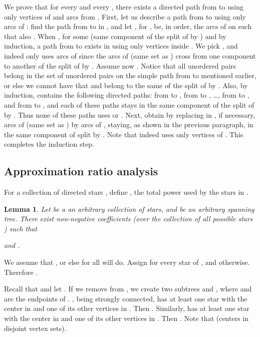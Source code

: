 \documentclass[12pt]{article}
\def\qed{ \ \vrule width.2cm height.2cm depth0cm\smallskip}
\def\proof{\noindent {\bf Proof. \ }}
\newtheorem{lemma}[proposition]{Lemma}
\begin{document}
We prove that
for every  and every , there exists a
directed  path  from  to   using only vertices of 
and arcs from . 
First, let us describe a path  from  to  using only arcs of :
find the path from  to  in ,  and let 
, for ,  
be, in order, the arcs of  on  such that also .
When ,  for some 
(same component of the split of  by ) and by
induction, a path  from  to  exists in  using only vertices
inside . We pick , and indeed  only uses arcs of 
since the arcs of  (same set as )
cross from one component to another of the split of  by .
Assume now . Notice that all unordered pairs 
belong in the set of unordered pairs  on the simple path from
 to  mentioned earlier, or else we cannot have that  and 
belong to the same  of the split of  by .
Also, by induction,   contains the following directed paths:
 from  to ,  from  to , \ldots, 
 from  to , and  from  to ,
and each of these paths stays in the same component of the split of  by .
Thus none of these paths uses  or .
Next, obtain  by replacing in ,
if necessary, arcs of  (same set as )
by arcs of , staying, as shown in the previous paragraph,
in the same component of  split by .
Note that  indeed uses only vertices of .
This completes the induction step.  \qed

\subsection{Approximation ratio analysis}


For a collection  of directed stars , 
define , 
the total power used by the stars in .

\begin{lemma}
Let  be a an arbitrary collection of stars,
and  be an arbitrary spanning tree.
There exist non-negative coefficients  (over the collection of
all possible stars ) such that
 
and .
\label{l_fractional}
\end{lemma}



\proof
We assume that , or else  for all  will do.
Assign  for  every star of , and  otherwise.
Therefore .

Recall that 
 and
let . 
If we remove  from , we create two subtrees
 and , where  and  are the endpoints of .
, being strongly connected,
has at least one star  with the center in  and one of 
its other vertices in . Then .
Similarly,   
has at least one star  with the center in  and one of 
its other vertices in . Then .
Note that  (centers in disjoint vertex sets).
\end{document}
